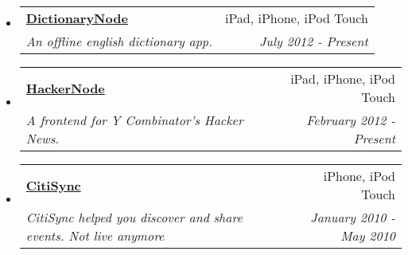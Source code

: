 \documentclass[letterpaper,11pt]{article}
\makeatletter
\newcommand{\ressubheading}[4]{
\begin{tabular*}{7.0in}{l@{\extracolsep{\fill}}r}
    \textbf{#1} & #2 \\
    \textit{#3} & \textit{#4} \\
\end{tabular*}\vspace{-6pt}}
\makeatother
\begin{document}
\begin{itemize}
\item
  \ressubheading{\href{https://itunes.apple.com/ca/app/dictionarynode/id538492050?mt=8}{DictionaryNode}}{iPad, iPhone, iPod Touch}{An offline english dictionary app.}{July 2012 - Present}
\item
  \ressubheading{\href{https://itunes.apple.com/ca/app/hackernode/id473882597?mt=8}{HackerNode}}{iPad, iPhone, iPod Touch}{A frontend for Y Combinator's Hacker News.}{February 2012 - Present}
\item        
  \ressubheading{\href{http://www.alligator.org/news/campus/article_8fe50876-c78b-11df-96a3-001cc4c03286.html}{CitiSync}}{iPhone, iPod Touch}{CitiSync helped you discover and share events. Not live anymore}{January 2010 - May 2010}
\end{itemize}

\vspace{0.3in}
\end{document}
